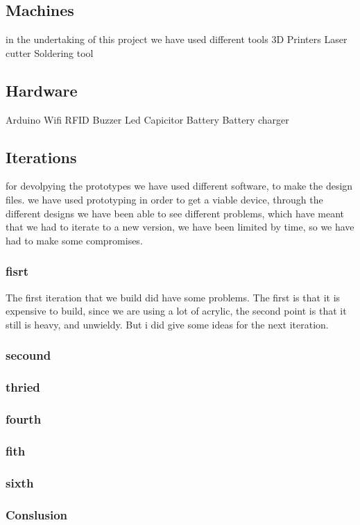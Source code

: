 \subsection{Machines}
in the undertaking of this project we have used different tools
3D Printers
Laser cutter
Soldering tool

\subsection{Hardware}
Arduino
Wifi
RFID
Buzzer
Led
Capicitor
Battery
Battery charger


\subsection{Iterations}
for devolpying the prototypes we have used different software, to make the design files.
we have used prototyping in order to get a viable device, through the different designs we have been able to see different problems, which have meant that we had to iterate to a new version, we have been limited by time, so we have had to make some compromises.

\subsubsection{fisrt}
The first iteration that we build did have some problems.
The first is that it is expensive to build, since we are using a lot of acrylic, the second point is that it still is heavy, and unwieldy.
But i did give some ideas for the next iteration.

\subsubsection{secound}


\subsubsection{thried}


\subsubsection{fourth}


\subsubsection{fith}

\subsubsection{sixth}

\subsubsection{Conslusion}